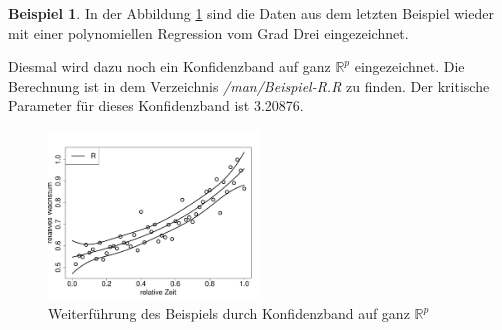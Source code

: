 \documentclass[12pt,a4paper]{article}
\theoremstyle{definition}
\newtheorem{Beispiel}[Definition]{Beispiel}
\theoremstyle{definition}
\theoremstyle{definition}
\theoremstyle{definition}
\newcommand{\cR}{3.20876}
\begin{document}
\begin{Beispiel}
In der Abbildung \ref{KB-ganz-R-BSP} sind die Daten aus dem letzten Beispiel wieder mit einer polynomiellen Regression vom Grad Drei eingezeichnet.

Diesmal wird dazu noch ein Konfidenzband auf ganz $\mathbb{R}^{p}$ eingezeichnet. Die Berechnung ist in dem Verzeichnis \textit{/man/Beispiel-R.R} zu finden. Der kritische Parameter für dieses Konfidenzband ist \cR.

\begin{figure}[H] 
  \centering
     \includegraphics[width=0.5\textwidth]{Bsp-KB-R}
  \caption{Weiterführung des Beispiels durch Konfidenzband auf ganz $\mathbb{R}^{p}$}
  \label{KB-ganz-R-BSP}
\end{figure}

\end{Beispiel}
\end{document}
